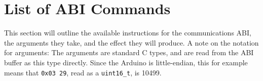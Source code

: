 \newcommand{\abispec}[6]{
\subsection{\texttt{#1}}

\begin{tabularx}{\textwidth}{>{\hsize=.5\hsize}XX}
\textbf{Instruction byte:}               & \texttt{#2} \\
\textbf{Argument bytes:}                 & #3 \\
\textbf{Argument type(s):}               & \texttt{#4} \\
\textbf{Action:}                         & #5 \\
\textbf{Relation to low-level commands:} & #6 \\
\end{tabularx}
}

\section{List of ABI Commands} \label{abi}

This section will outline the available instructions for the communications
ABI, the arguments they take, and the effect they will produce. A note on the
notation for arguments: The arguments are standard C types, and are read from
the ABI buffer as this type directly. Since the Arduino is little-endian, this
for example means that \texttt{0x03 29}, read as a \texttt{uint16\_t}, is
10499.

